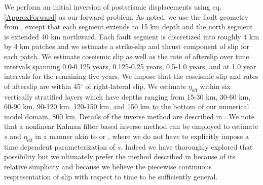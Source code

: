 \documentclass[12pt]{article}
\begin{document}
We perform an initial inversion of postseismic displacements using eq. \ref{ApproxForward} as our forward problem. As noted, we use the fault geometry from \citet{Wei2011}, except that each segment extends to 15 km depth and the north segment is extended 40 km northward.  Each fault segment is discretized into roughly 4 km by 4 km patches and we estimate a strike-slip and thrust component of slip for each patch. We estimate coseismic slip as well as the rate of afterslip over time intervals spanning 0.0-0.125 years, 0.125-0.25 years, 0.5-1.0 years, and at 1.0 year intervals for the remaining five years.  We impose that the coseismic slip and rates of afterslip are within 45$^\circ$ of right-lateral slip.  We estimate $\eta_{\mathrm{eff}}$ within six vertically stratified layers which have depths ranging from 15-30 km, 30-60 km, 60-90 km, 90-120 km, 120-150 km, and 150 km to the bottom of our numerical model domain, 800 km. Details of the inverse method are described in \citet{Hines2015}.  We note that a nonlinear Kalman filter based inverse method can be employed to estimate $s$ and $\eta_{\mathrm{eff}}$ in a manner akin to \citet{Segall1997} or \citet{McGuire2003}, where we do not have to explicitly impose a time dependent parameterization of $s$. Indeed we have thoroughly explored that possibility but we ultimately prefer the method described in \citet{Hines2015} because of its relative simplicity and because we believe the piecewise continuous respresentation of slip with respect to time to be sufficiently general.
\end{document}
